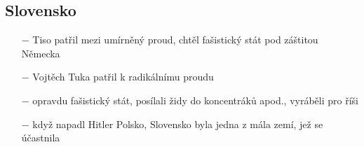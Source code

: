 \documentclass{article}
\begin{document}
\subsection*{Slovensko}
\begin{itemize}
    \vspace{-0.5em}
    \setlength\itemsep{0.15em}
    \item[$-$] Tiso patřil mezi umírněný proud, chtěl fašistický stát pod záštitou Německa
    \item[$-$] Vojtěch Tuka patřil k radikálnímu proudu
    \item[$-$] opravdu fašistický stát, posílali židy do koncentráků apod., vyráběli pro říši
    \item[$-$] když napadl Hitler Polsko, Slovensko byla jedna z mála zemí, jež se účastnila
\end{itemize}
\end{document}
